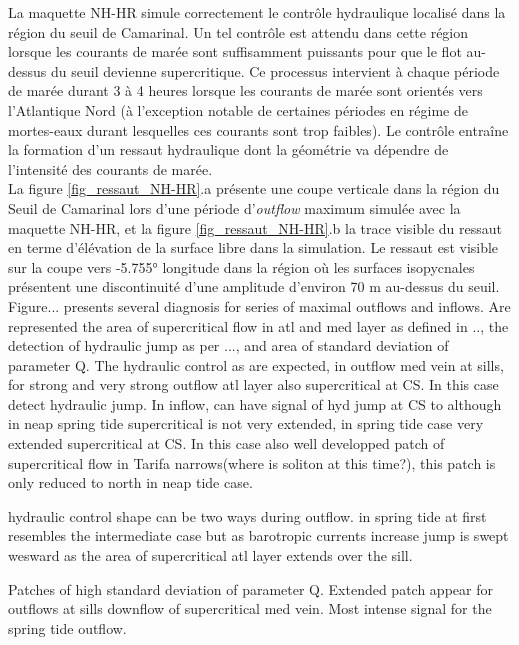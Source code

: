 La maquette NH-HR simule correctement le contrôle hydraulique localisé dans la région du seuil de Camarinal. Un tel contrôle est attendu dans cette région lorsque les courants de marée sont suffisamment puissants pour que le flot au-dessus du seuil devienne supercritique. Ce processus intervient à chaque période de marée durant 3 à 4 heures lorsque les courants de marée sont orientés vers l'Atlantique Nord (à l'exception notable de certaines périodes en régime de mortes-eaux durant lesquelles ces courants sont trop faibles). Le contrôle entraîne la formation d'un ressaut hydraulique dont la géométrie va dépendre de l'intensité des courants de marée. \\
La figure \ref{fig_ressaut_NH-HR}.a présente une coupe verticale dans la région du Seuil de Camarinal lors d'une période d'\textit{outflow} maximum simulée avec la maquette NH-HR, et la figure \ref{fig_ressaut_NH-HR}.b la trace visible du ressaut en terme d'élévation de la surface libre dans la simulation. Le ressaut est visible sur la coupe vers -5.755° longitude dans la région où les surfaces isopycnales présentent une discontinuité d'une amplitude d'environ 70 m au-dessus du seuil.\\



Figure... presents several diagnosis for series of maximal outflows and inflows. Are represented the area of supercritical flow in atl and med layer as defined in .., the detection of hydraulic jump as per ..., and area of standard deviation of parameter Q. The hydraulic control as are expected, in outflow med vein at sills, for strong and very strong outflow atl layer also supercritical at CS. In this case detect hydraulic jump. In inflow, can have signal of hyd jump at CS to although in neap spring tide supercritical is not very extended, in spring tide case very extended supercritical at CS. In this case also well developped patch of supercritical flow in Tarifa narrows(where is soliton at this time?), this patch is only reduced to north in neap tide case.

hydraulic control shape can be two ways during outflow. in spring tide at first resembles the intermediate case but as barotropic currents increase jump is swept wesward as the area of supercritical atl layer extends over the sill.

Patches of high standard deviation of parameter Q. Extended patch appear for outflows at sills downflow of supercritical med vein. Most intense signal for the spring tide outflow.

